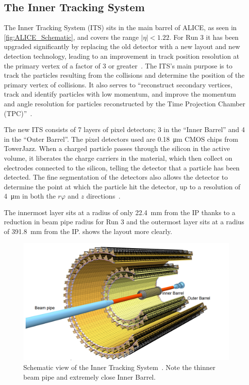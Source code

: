 \documentclass[11pt]{article}
\numberwithin{equation}{section}
\numberwithin{figure}{section}
\numberwithin{table}{section}
\begin{document}
\subsection{The Inner Tracking System}
The Inner Tracking System (ITS) sits in the main barrel of ALICE, as seen in \cref{fig:ALICE_Schematic}, and covers the range $|\eta|<1.22$. For Run 3 it has been upgraded significantly by replacing the old detector with a new layout and new detection technology, leading to an improvement in track position resolution at the primary vertex of a factor of 3 or greater~\cite{ITS_Upgrade_TDR}. The ITS's main purpose is to track the particles resulting from the collisions and determine the position of the primary vertex of collisions. It also serves to ``reconstruct secondary vertices, track and identify particles with low momentum, and improve the momentum and angle resolution for particles reconstructed by the Time Projection Chamber (TPC)''~\cite{ITS_Info}.

The new ITS consists of 7 layers of pixel detectors; 3 in the ``Inner Barrel'' and 4 in the ``Outer Barrel''. The pixel detectors used are \SI{0.18}{\micro\metre} CMOS chips from TowerJazz. When a charged particle passes through the silicon in the active volume, it liberates the charge carriers in the material, which then collect on electrodes connected to the silicon, telling the detector that a particle has been detected. The fine segmentation of the detectors also allows the detector to determine the point at which the particle hit the detector, up to a resolution of \SI{4}{\micro\metre} in both the $r\varphi$ and $z$ directions~\cite{ITS_Upgrade_TDR}.

The innermost layer sits at a radius of only \SI{22.4}{\milli\metre} from the IP thanks to a reduction in beam pipe radius for Run 3 and the outermost layer sits at a radius of \SI{391.8}{\milli\metre} from the IP.  shows the layout more clearly. 

\begin{figure}[h]
    \begin{center}
        \includegraphics[width=.8\textwidth]{Figs/ITS_Schematic.png}
        \caption{Schematic view of the Inner Tracking System~\cite{ITS_Upgrade_TDR}. Note the thinner beam pipe and extremely close Inner Barrel.}
        \label{fig:ITS_Schematic}
    \end{center}
\end{figure}
\end{document}
